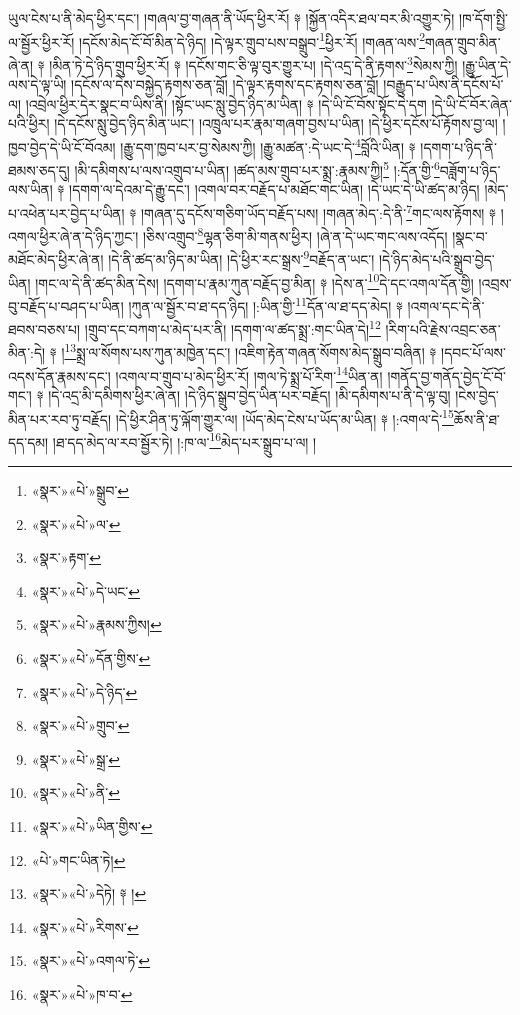 ཡུལ་ངེས་པ་ནི་མེད་ཕྱིར་དང་། །གཞལ་བྱ་གཞན་ནི་ཡོད་ཕྱིར་རོ། ༈ །སྐྱོན་འདིར་ཐལ་བར་མི་འགྱུར་ཏེ། །ཁ་དོག་སྤྱི་ལ་སྦྱོར་ཕྱིར་རོ། །དངོས་མེད་ངོ་བོ་མིན་དེ་ཉིད། །དེ་ལྟར་གྲུབ་པས་བསྒྲུབ་\footnote{«སྣར་»«པེ་»སྒྲུབ་}ཕྱིར་རོ། །གཞན་ལས་\footnote{«སྣར་»«པེ་»ལ་}གཞན་གྲུབ་མིན་ཞེ་ན། ༈ །མིན་ཏེ་དེ་ཉིད་གྲུབ་ཕྱིར་རོ། ༈ །དངོས་གང་ཅི་ལྟ་བུར་གྱུར་པ། །དེ་འདྲ་དེ་ནི་རྟགས་\footnote{«སྣར་»རྟག་}སེམས་ཀྱི། །རྒྱུ་ཡིན་དེ་ལས་དེ་ལྟ་ཡི། །དངོས་ལ་དེས་བསྐྱེད་རྟགས་ཅན་བློ། །དེ་ལྟར་རྟགས་དང་རྟགས་ཅན་བློ། །བརྒྱུད་པ་ཡིས་ནི་དངོས་པོ་ལ། །འབྲེལ་ཕྱིར་དེར་སྣང་བ་ཡིས་ནི། །སྟོང་ཡང་སླུ་བྱེད་ཉིད་མ་ཡིན། ༈ །དེ་ཡི་ངོ་བོས་སྟོང་དེ་དག །དེ་ཡི་ངོ་བོར་ཞེན་པའི་ཕྱིར། །དེ་དངོས་སླུ་བྱེད་ཉིད་མིན་ཡང་། །འཁྲུལ་པར་རྣམ་གཞག་བྱས་པ་ཡིན། །དེ་ཕྱིར་དངོས་པོ་རྟོགས་བྱ་ལ། །ཁྱབ་བྱེད་དེ་ཡི་ངོ་བོའམ། །རྒྱུ་དག་ཁྱབ་པར་བྱ་སེམས་ཀྱི། །རྒྱུ་མཚན་:དེ་ཡང་དེ་\footnote{«སྣར་»«པེ་»དེ་ཡང་}བློའི་ཡིན། ༈ །དགག་པ་ཉིད་ནི་ཐམས་ཅད་དུ། །མི་དམིགས་པ་ལས་འགྲུབ་པ་ཡིན། །ཚད་མས་གྲུབ་པར་སྨྲ་:རྣམས་ཀྱི།\footnote{«སྣར་»«པེ་»རྣམས་ཀྱིས།} །:དོན་གྱི་\footnote{«སྣར་»«པེ་»དོན་གྱིས་}བཟློག་པ་ཉིད་ལས་ཡིན། ༈ །དགག་ལ་དེའམ་དེ་རྒྱུ་དང་། །འགལ་བར་བརྗོད་པ་མཐོང་གང་ཡིན། །དེ་ཡང་དེ་ཡི་ཚད་མ་ཉིད། །མེད་པ་འཕེན་པར་བྱེད་པ་ཡིན། ༈ །གཞན་དུ་དངོས་གཅིག་ཡོད་བརྗོད་པས། །གཞན་མེད་:དེ་ནི་\footnote{«སྣར་»«པེ་»དེ་ཉིད་}གང་ལས་རྟོགས། ༈ །འགལ་ཕྱིར་ཞེ་ན་དེ་ཉིད་ཀྱང་། །ཅིས་འགྲུབ་\footnote{«སྣར་»«པེ་»གྲུབ་}ལྷན་ཅིག་མི་གནས་ཕྱིར། །ཞེ་ན་དེ་ཡང་གང་ལས་འདོད། །སྣང་བ་མཐོང་མེད་ཕྱིར་ཞེ་ན། །དེ་ནི་ཚད་མ་ཉིད་མ་ཡིན། །དེ་ཕྱིར་རང་སྒྲས་\footnote{«སྣར་»«པེ་»སྒྲ་}བརྗོད་ན་ཡང་། །དེ་ཉིད་མེད་པའི་སྒྲུབ་བྱེད་ཡིན། །གང་ལ་དེ་ནི་ཚད་མིན་དེས། །དགག་པ་རྣམ་ཀུན་བརྗོད་བྱ་མིན། ༈ །དེས་ན་\footnote{«སྣར་»«པེ་»ནི་}དེ་དང་འགལ་དོན་གྱི། །འབྲས་བུ་བརྗོད་པ་བཤད་པ་ཡིན། །ཀུན་ལ་སྦྱོར་བ་ཐ་དད་ཉིད། །:ཡིན་གྱི་\footnote{«སྣར་»«པེ་»ཡིན་གྱིས་}དོན་ལ་ཐ་དད་མེད། ༈ །འགལ་དང་དེ་ནི་ཐབས་བཅས་པ། །གྲུབ་དང་བཀག་པ་མེད་པར་ནི། །དགག་ལ་ཚད་སྨྲ་:གང་ཡིན་དེ།\footnote{«པེ་»གང་ཡིན་ཏེ།} །རིག་པའི་རྗེས་འབྲང་ཅན་མིན་:དེ། ༈ །\footnote{«སྣར་»«པེ་»དེཏེ། ༈ །}སྨྲ་ལ་སོགས་པས་ཀུན་མཁྱེན་དང་། །འཇིག་རྟེན་གཞན་སོགས་མེད་སྒྲུབ་བཞིན། ༈ །དབང་པོ་ལས་འདས་དོན་རྣམས་དང་། །འགལ་བ་གྲུབ་པ་མེད་ཕྱིར་རོ། །གལ་ཏེ་སྨྲ་པོ་རིག་\footnote{«སྣར་»«པེ་»རིགས་}ཡིན་ན། །གནོད་བྱ་གནོད་བྱེད་ངོ་བོ་གང་། ༈ །དེ་འདྲ་མི་དམིགས་ཕྱིར་ཞེ་ན། །དེ་ཉིད་སྒྲུབ་བྱེད་ཡིན་པར་བརྗོད། །མི་དམིགས་པ་ནི་དེ་ལྟ་བུ། །ངེས་བྱེད་མིན་པར་རབ་ཏུ་བརྗོད། །དེ་ཕྱིར་ཤིན་ཏུ་ལྐོག་གྱུར་ལ། །ཡོད་མེད་ངེས་པ་ཡོད་མ་ཡིན། ༈ །:འགལ་དེ་\footnote{«སྣར་»«པེ་»འགལ་ཏེ་}ཆོས་ནི་ཐ་དད་དམ། །ཐ་དད་མེད་ལ་རབ་སྦྱོར་ཏེ། །:ཁ་ལ་\footnote{«སྣར་»«པེ་»ཁ་བ་}མེད་པར་སྒྲུབ་པ་ལ། །
